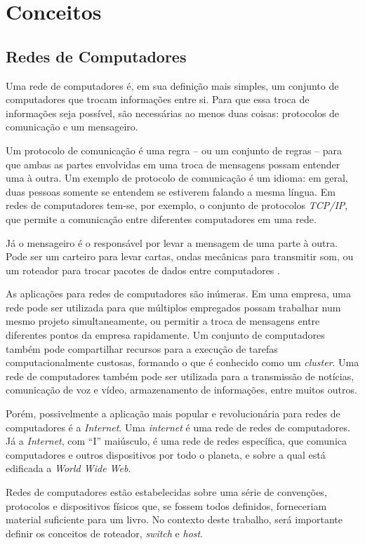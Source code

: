 \chapter{Conceitos}
\label{ch:intro}

\section{Redes de Computadores}
\label{ch:redes}

Uma rede de computadores é, em sua definição mais simples, um conjunto de computadores que trocam informações entre si. Para que essa troca de informações seja possível, são necessárias ao menos duas coisas: protocolos de comunicação e um mensageiro.

Um protocolo de comunicação é uma regra – ou um conjunto de regras – para que ambas as partes envolvidas em uma troca de mensagens possam entender uma à outra. Um exemplo de protocolo de comunicação é um idioma: em geral, duas pessoas somente se entendem se estiverem falando a mesma língua. Em redes de computadores tem-se, por exemplo, o conjunto de protocolos \textit{TCP/IP}, que permite a comunicação entre diferentes computadores em uma rede.
	
Já o mensageiro é o responsável por levar a mensagem de uma parte à outra. Pode ser um carteiro para levar cartas, ondas mecânicas para transmitir som, ou um roteador para trocar pacotes de dados entre computadores \cite{kurose}.
	
As aplicações para redes de computadores são inúmeras. Em uma empresa, uma rede pode ser utilizada para que múltiplos empregados possam trabalhar num mesmo projeto simultaneamente, ou permitir a troca de mensagens entre diferentes pontos da empresa rapidamente. Um conjunto de computadores também pode compartilhar recursos para a execução de tarefas computacionalmente custosas, formando o que é conhecido como um \textit{cluster}. Uma rede de computadores também pode ser utilizada para a transmissão de notícias, comunicação de voz e vídeo, armazenamento de informações, entre muitos outros.
	
Porém, possivelmente a aplicação mais popular e revolucionária para redes de computadores é a \textit{Internet}. Uma \textit{internet} é uma rede de redes de computadores. Já a \textit{Internet}, com “I” maiúsculo, é uma rede de redes específica, que comunica computadores e outros dispositivos por todo o planeta, e sobre a qual está edificada a \textit{World Wide Web}.
	
Redes de computadores estão estabelecidas sobre uma série de convenções, protocolos e dispositivos físicos que, se fossem todos definidos, forneceriam material suficiente para um livro. No contexto deste trabalho, será importante definir os conceitos de roteador, \textit{switch} e \textit{host}.

